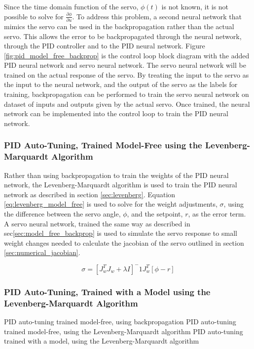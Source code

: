 \documentclass[letterpaper,12pt]{article}
\newcommand{\di}{\partial}
\begin{document}
Since the time domain function of the servo, $\phi(t)$ is not known, it is not possible to solve for $\frac{\di \phi}{\di u}$. To address this problem, a second neural network that mimics the servo can be used in the backpropagation rather than the actual servo. This allows the error to be backpropagated through the neural network, through the PID controller and to the PID neural network. Figure \ref{fig:pid_model_free_backprop} is the control loop block diagram with the added PID neural network and servo neural network. The servo neural network will be trained on the actual response of the servo. By treating the input to the servo as the input to the neural network, and the output of the servo as the labels for training, backpropagation can be performed to train the servo neural network on dataset of inputs and outputs given by the actual servo. Once trained, the neural network can be implemented into the control loop to train the PID neural network.

\subsubsection{PID Auto-Tuning, Trained Model-Free using the Levenberg-Marquardt Algorithm}
Rather than using backpropagation to train the weights of the PID neural network, the Levenberg-Marquardt algorithm is used to train the PID neural network as described in section \ref{sec:levenberg}. Equation \ref{eq:levenberg_model_free} is used to solve for the weight adjustments, $\sigma$, using the difference between the servo angle, $\phi$, and the setpoint, $r$, as the error term. A servo neural network, trained the same way as described in sec\ref{sec:model_free_backprop} is used to simulate the servo response to small weight changes needed to calculate the jacobian of the servo outlined in section \ref{sec:numerical_jacobian}.

\begin{equation}
	\label{eq:levenberg_model_free}
	\sigma = [J_w^T J_w + \lambda I]^-1 J_w^T [\phi - r]
\end{equation}

\subsubsection{PID Auto-Tuning, Trained with a Model using the Levenberg-Marquardt Algorithm}


PID auto-tuning trained model-free, using backpropagation
PID auto-tuning trained model-free, using the Levenberg-Marquardt algorithm
PID auto-tuning trained with a model, using the Levenberg-Marquardt algorithm
\end{document}
